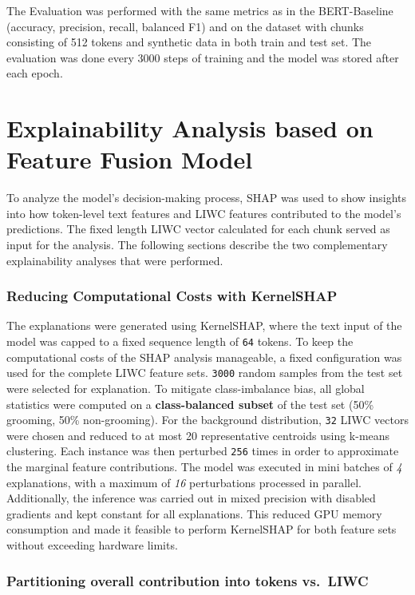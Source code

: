 The Evaluation was performed with the same metrics as in the BERT-Baseline (accuracy, precision, recall, balanced F1) and on the dataset with chunks consisting of 512 tokens and synthetic data in both train and test set. The evaluation was done every 3000 steps of training and the model was stored after each epoch.

\section{Explainability Analysis based on Feature Fusion Model}
To analyze the model's decision-making process, SHAP was used to show insights into how token-level text features and LIWC features contributed to the model's predictions. The fixed length LIWC vector calculated for each chunk served as input for the analysis. The following sections describe the two complementary explainability analyses that were performed. 

\subsubsection{Reducing Computational Costs with KernelSHAP}

The explanations were generated using KernelSHAP, where the text input of the model was capped to a fixed sequence length of \texttt{64} tokens. To keep the computational costs of the SHAP analysis manageable, a fixed configuration was used for the complete LIWC feature sets.  \texttt{3000} random samples from the test set were selected for explanation. To mitigate class-imbalance bias, all global statistics were computed on a \textbf{class-balanced subset} of the test set (50\% grooming, 50\% non-grooming). For the background distribution, \texttt{32} LIWC vectors were chosen and reduced to at most 20 representative centroids using k-means clustering. Each instance was then perturbed \texttt{256} times in order to approximate the marginal feature contributions. The model was executed in mini batches of \textit{4} explanations, with a maximum of \textit{16} perturbations processed in parallel. Additionally, the inference was carried out in mixed precision with disabled gradients and kept constant for all explanations. This reduced GPU memory consumption and made it feasible to perform KernelSHAP for both feature sets without exceeding hardware limits.


\subsubsection{Partitioning overall contribution into tokens vs.\ LIWC}\label{sec:token_vs_liwc_share}

